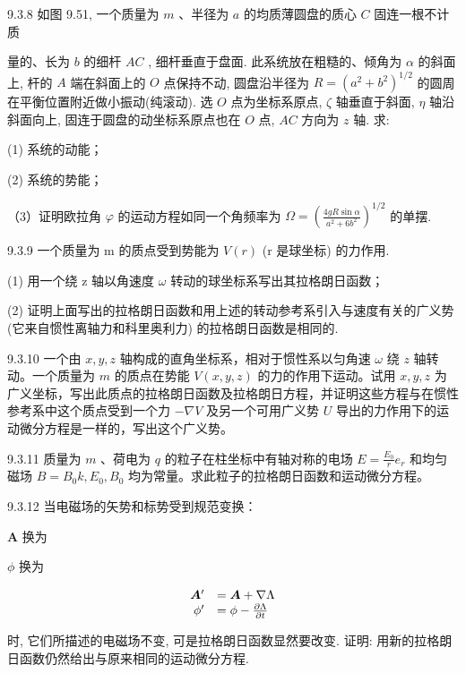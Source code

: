 \begin{problem}{9.3.8}
如图 9.51, 一个质量为 $m$ 、半径为 $a$ 的均质薄圆盘的质心 $C$ 固连一根不计质

量的、长为 $b$ 的细杆 $AC$ , 细杆垂直于盘面. 此系统放在粗糙的、倾角为 $\alpha$ 的斜面上, 杆的 $A$ 端在斜面上的 $O$ 点保持不动, 圆盘沿半径为 $R = (a^2 + b^2)^{1/2}$ 的圆周在平衡位置附近做小振动(纯滚动). 选 $O$ 点为坐标系原点, $\zeta$ 轴垂直于斜面, $\eta$ 轴沿斜面向上, 固连于圆盘的动坐标系原点也在 $O$ 点, $AC$ 方向为 $z$ 轴. 求:

(1) 系统的动能；

(2) 系统的势能；

（3）证明欧拉角 $\varphi$ 的运动方程如同一个角频率为 $\Omega = \left(\frac{4gR\sin\alpha}{a^2 + 6b^2}\right)^{1 / 2}$ 的单摆.
\begin{center}

\end{center}
\end{problem}
\clearpage


\begin{problem}{9.3.9}
一个质量为 m 的质点受到势能为 $V(r)$ (r 是球坐标) 的力作用.

(1) 用一个绕 z 轴以角速度 $\omega$ 转动的球坐标系写出其拉格朗日函数；

(2) 证明上面写出的拉格朗日函数和用上述的转动参考系引入与速度有关的广义势 (它来自惯性离轴力和科里奥利力) 的拉格朗日函数是相同的.
\end{problem}
\clearpage


\begin{problem}{9.3.10}
一个由 $x, y, z$ 轴构成的直角坐标系，相对于惯性系以匀角速 $\omega$ 绕 $z$ 轴转动。一个质量为 $m$ 的质点在势能 $V(x, y, z)$ 的力的作用下运动。试用 $x, y, z$ 为广义坐标，写出此质点的拉格朗日函数及拉格朗日方程，并证明这些方程与在惯性参考系中这个质点受到一个力 $-\nabla V$ 及另一个可用广义势 $U$ 导出的力作用下的运动微分方程是一样的，写出这个广义势。
\end{problem}
\clearpage


\begin{problem}{9.3.11}
质量为 $m$ 、荷电为 $q$ 的粒子在柱坐标中有轴对称的电场 $E = \frac{E_0}{r} e_r$ 和均匀磁场 $B = B_0 k, E_0, B_0$ 均为常量。求此粒子的拉格朗日函数和运动微分方程。
\end{problem}
\clearpage


\begin{problem}{9.3.12}
当电磁场的矢势和标势受到规范变换：

$\bm{A}$ 换为

$\phi$ 换为

\[
\begin{array}{r l} \boldsymbol {A} ^ {\prime} & = \boldsymbol {A} + \nabla \Lambda \\ \phi^ {\prime} & = \phi - \frac {\partial \Lambda}{\partial t} \end{array}
\]

时, 它们所描述的电磁场不变, 可是拉格朗日函数显然要改变. 证明: 用新的拉格朗日函数仍然给出与原来相同的运动微分方程.
\end{problem}
\clearpage



